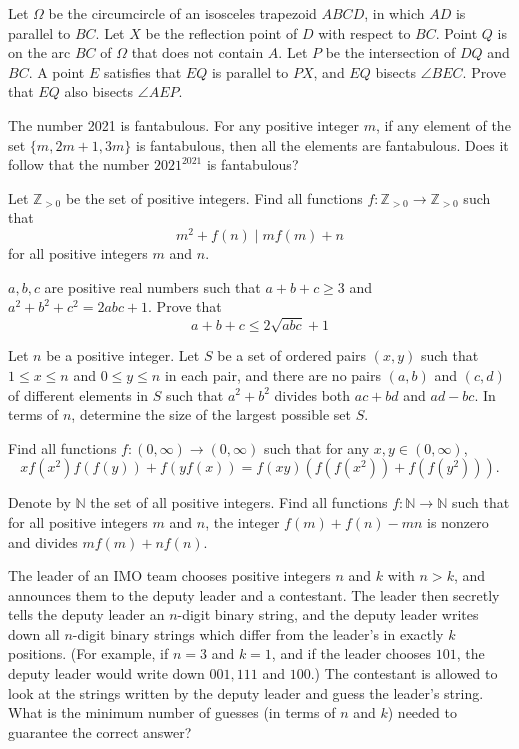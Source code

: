 \documentclass[11pt]{scrartcl}
\begin{document}
\begin{problem}[165465510156789]
	Let $\Omega$ be the circumcircle of an isosceles trapezoid $ABCD$, in which $AD$ is parallel to $BC$. Let $X$ be the reflection point of $D$ with respect to $BC$. Point $Q$ is on the arc $BC$ of $\Omega$ that does not contain $A$. Let $P$ be the intersection of $DQ$ and $BC$. A point $E$ satisfies that $EQ$ is parallel to $PX$, and $EQ$ bisects $\angle BEC$. Prove that $EQ$ also bisects $\angle AEP$.
\end{problem}
\begin{problem}[166169225490521]
	The number 2021 is fantabulous. For any positive integer $m$, if any element of the set $\{m, 2m+1, 3m\}$ is fantabulous, then all the elements are fantabulous. Does it follow that the number $2021^{2021}$ is fantabulous?
\end{problem}
\begin{problem}[168250003841029]
	Let $\mathbb{Z} _{>0}$ be the set of positive integers. Find all functions $f: \mathbb{Z} _{>0}\rightarrow \mathbb{Z} _{>0}$ such that
\[ m^2 + f(n) \mid mf(m) +n \]
for all positive integers $m$ and $n$.
\end{problem}
\begin{problem}[171473649474951]
	$a,b,c$ are positive real numbers such that $a+b+c\ge 3$ and $a^2+b^2+c^2=2abc+1$. Prove that$$a+b+c\le 2\sqrt{abc}+1$$
\end{problem}
\begin{problem}[172839066140251]
Let $n$ be a positive integer. Let $S$ be a set of ordered pairs $(x, y)$ such that $1\leq x \leq n$ and $0 \leq y \leq n$ in each pair, and there are no pairs $(a, b)$ and $(c, d)$ of different elements in $S$ such that $a^2+b^2$ divides both
$ac+bd$ and $ad - bc$. In terms of $n$, determine the size of the largest possible set $S$.
\end{problem}
\begin{problem}[173010886819234]
	Find all functions $f:(0,\infty)\rightarrow (0,\infty)$ such that for any $x,y\in (0,\infty)$,$$xf(x^2)f(f(y)) + f(yf(x)) = f(xy) \left(f(f(x^2)) + f(f(y^2))\right).$$
\end{problem}
\begin{problem}[173979142158596]
Denote by $\mathbb{N}$ the set of all positive integers. Find all functions $f:\mathbb{N}\rightarrow \mathbb{N}$ such that for all positive integers $m$ and $n$, the integer $f(m)+f(n)-mn$ is nonzero and divides $mf(m)+nf(n)$.
\end{problem}
\begin{problem}[175119746688413]
	The leader of an IMO team chooses positive integers $n$ and $k$ with $n > k$, and announces them to the deputy leader and a contestant. The leader then secretly tells the deputy leader an $n$-digit binary string, and the deputy leader writes down all $n$-digit binary strings which differ from the leader’s in exactly $k$ positions. (For example, if $n = 3$ and $k = 1$, and if the leader chooses $101$, the deputy leader would write down $001, 111$ and $100$.) The contestant is allowed to look at the strings written by the deputy leader and guess the leader’s string. What is the minimum number of guesses (in terms of $n$ and $k$) needed to guarantee the correct answer?
\end{problem}
\end{document}
